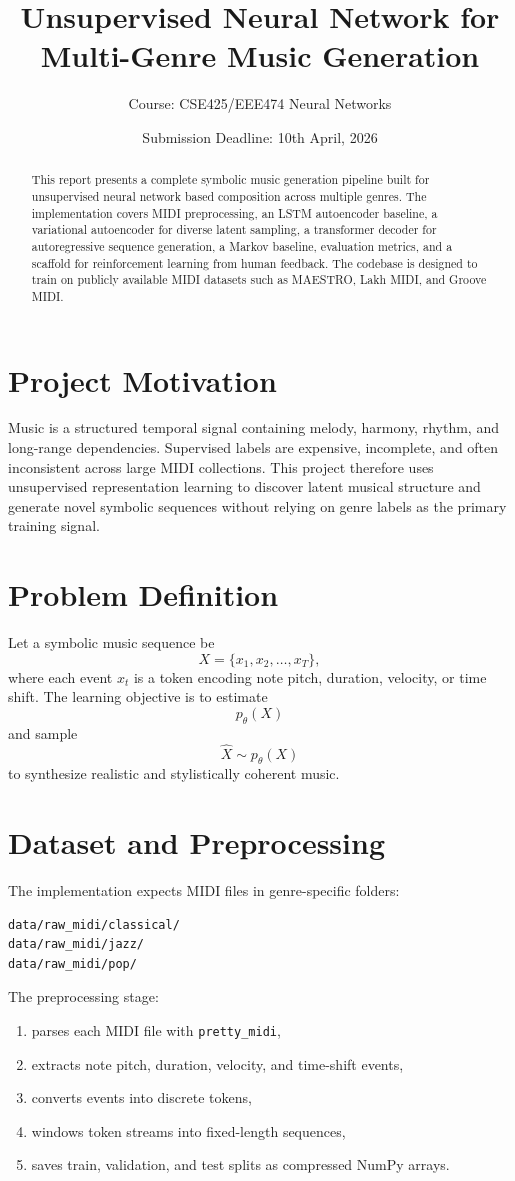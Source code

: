 \documentclass[11pt]{article}
\title{Unsupervised Neural Network for\\Multi-Genre Music Generation}
\author{Course: CSE425/EEE474 Neural Networks}
\date{Submission Deadline: 10th April, 2026}
\begin{document}
\maketitle

\begin{abstract}
This report presents a complete symbolic music generation pipeline built for unsupervised neural network based composition across multiple genres. The implementation covers MIDI preprocessing, an LSTM autoencoder baseline, a variational autoencoder for diverse latent sampling, a transformer decoder for autoregressive sequence generation, a Markov baseline, evaluation metrics, and a scaffold for reinforcement learning from human feedback. The codebase is designed to train on publicly available MIDI datasets such as MAESTRO, Lakh MIDI, and Groove MIDI.
\end{abstract}

\section{Project Motivation}
Music is a structured temporal signal containing melody, harmony, rhythm, and long-range dependencies. Supervised labels are expensive, incomplete, and often inconsistent across large MIDI collections. This project therefore uses unsupervised representation learning to discover latent musical structure and generate novel symbolic sequences without relying on genre labels as the primary training signal.

\section{Problem Definition}
Let a symbolic music sequence be
\[
X = \{x_1, x_2, \dots, x_T\},
\]
where each event $x_t$ is a token encoding note pitch, duration, velocity, or time shift. The learning objective is to estimate
\[
p_\theta(X)
\]
and sample
\[
\hat{X} \sim p_\theta(X)
\]
to synthesize realistic and stylistically coherent music.

\section{Dataset and Preprocessing}
The implementation expects MIDI files in genre-specific folders:
\begin{verbatim}
data/raw_midi/classical/
data/raw_midi/jazz/
data/raw_midi/pop/
\end{verbatim}

The preprocessing stage:
\begin{enumerate}
    \item parses each MIDI file with \texttt{pretty\_midi},
    \item extracts note pitch, duration, velocity, and time-shift events,
    \item converts events into discrete tokens,
    \item windows token streams into fixed-length sequences,
    \item saves train, validation, and test splits as compressed NumPy arrays.
\end{enumerate}
\end{document}
